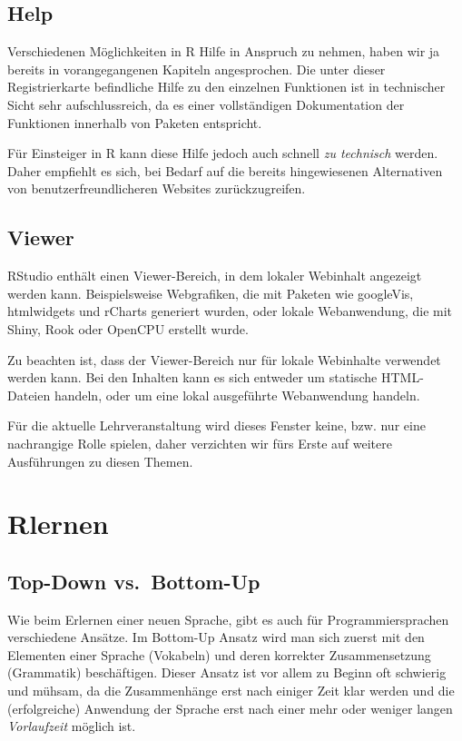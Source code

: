 \documentclass[]{article}
\begin{document}
\subsection*{Help}\label{help}

Verschiedenen Möglichkeiten in R Hilfe in Anspruch zu nehmen, haben wir
ja bereits in vorangegangenen Kapiteln angesprochen. Die unter dieser
Registrierkarte befindliche Hilfe zu den einzelnen Funktionen ist in
technischer Sicht sehr aufschlussreich, da es einer vollständigen
Dokumentation der Funktionen innerhalb von Paketen entspricht.

Für Einsteiger in R kann diese Hilfe jedoch auch schnell \emph{zu
technisch} werden. Daher empfiehlt es sich, bei Bedarf auf die bereits
hingewiesenen Alternativen von benutzerfreundlicheren Websites
zurückzugreifen.

\subsection*{Viewer}\label{viewer}

RStudio enthält einen Viewer-Bereich, in dem lokaler Webinhalt angezeigt
werden kann. Beispielsweise Webgrafiken, die mit Paketen wie googleVis,
htmlwidgets und rCharts generiert wurden, oder lokale Webanwendung, die
mit Shiny, Rook oder OpenCPU erstellt wurde.

Zu beachten ist, dass der Viewer-Bereich nur für lokale Webinhalte
verwendet werden kann. Bei den Inhalten kann es sich entweder um
statische HTML-Dateien handeln, oder um eine lokal ausgeführte
Webanwendung handeln.

Für die aktuelle Lehrveranstaltung wird dieses Fenster keine, bzw. nur
eine nachrangige Rolle spielen, daher verzichten wir fürs Erste auf
weitere Ausführungen zu diesen Themen.

\section{Rlernen}\label{rlernen}

\subsection*{Top-Down vs.~Bottom-Up}\label{top-down-vs.bottom-up}

Wie beim Erlernen einer neuen Sprache, gibt es auch für
Programmiersprachen verschiedene Ansätze. Im Bottom-Up Ansatz wird man
sich zuerst mit den Elementen einer Sprache (Vokabeln) und deren
korrekter Zusammensetzung (Grammatik) beschäftigen. Dieser Ansatz ist
vor allem zu Beginn oft schwierig und mühsam, da die Zusammenhänge erst
nach einiger Zeit klar werden und die (erfolgreiche) Anwendung der
Sprache erst nach einer mehr oder weniger langen \emph{Vorlaufzeit}
möglich ist.
\end{document}

